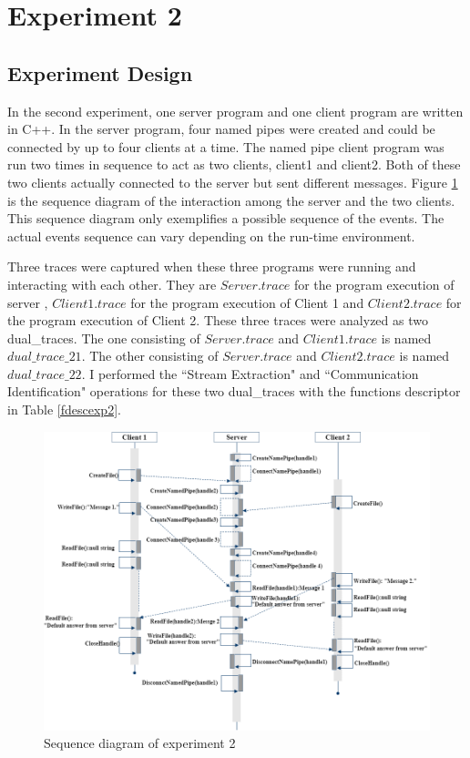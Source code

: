 \documentclass[12pt,oneside]{book}
\begin{document}
\section{Experiment 2}
\subsection{Experiment Design}
In the second experiment, one server program and one client program are written in C++. In the server program, four named pipes were created and could be connected by up to four clients at a time. The named pipe client program was run two times in sequence to act as two clients, client1 and client2. Both of these two clients actually connected to the server but sent different messages. Figure \ref{exp2} is the sequence diagram of the interaction among the server and the two clients. This sequence diagram only exemplifies a possible sequence of the events. The actual events sequence can vary depending on the run-time environment. 

Three traces were captured when these three programs were running and interacting with each other. They are $Server.trace$ for the program execution of server , $Client1.trace$ for the program execution of Client 1 and $Client2.trace$ for the program execution of Client 2. These three traces were analyzed as two dual\_traces. The one consisting of $Server.trace$ and $Client1.trace$ is named $dual\_trace\_21$. The other consisting of $Server.trace$ and $Client2.trace$ is named $dual\_trace\_22$. I performed the ``Stream Extraction" and ``Communication Identification" operations for these two dual\_traces with the functions descriptor in Table \ref{fdescexp2}.

\begin{figure}[H]
\centerline{\includegraphics[scale=0.55]{Figures/exp2}}
 \caption{Sequence diagram of experiment 2}
\label{exp2}
\end{figure}
\end{document}
